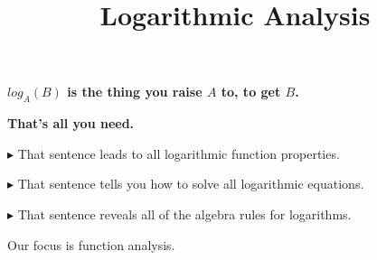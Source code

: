 \documentclass{ximera}
\title{Logarithmic Analysis}
\begin{document}
\begin{abstract}
\end{abstract}
\maketitle






\begin{center}
\textbf{\textcolor{red!70!black}{$log_A(B)$ is the thing you raise $A$ to, to get $B$.}}
\end{center}






\begin{center}
\textbf{\textcolor{blue!55!black}{That's all you need.}}
\end{center}





\textbf{\textcolor{red!70!darkgray}{$\blacktriangleright$}} That sentence leads to all logarithmic function properties. 

\textbf{\textcolor{red!70!darkgray}{$\blacktriangleright$}} That sentence tells you how to solve all logarithmic equations. 

\textbf{\textcolor{red!70!darkgray}{$\blacktriangleright$}} That sentence reveals all of the algebra rules for logarithms. 





Our focus is function analysis.
\end{document}
